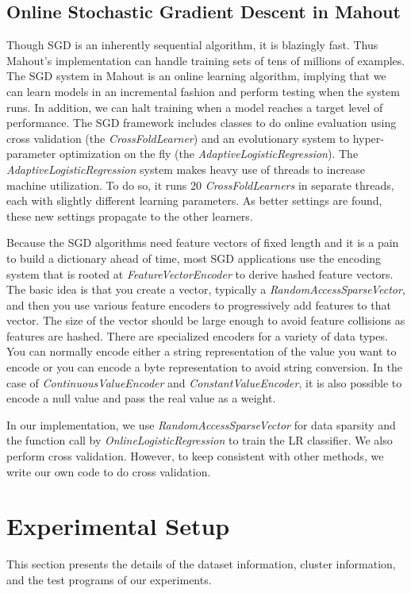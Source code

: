 \documentclass[10pt, conference, compsocconf]{IEEEtran}
\begin{document}
\subsection{Online Stochastic Gradient Descent in Mahout}
Though SGD is an inherently sequential algorithm, it is blazingly fast. Thus Mahout's implementation can handle training sets of tens of millions of examples.
The SGD system in Mahout is an online learning algorithm, implying that we can learn models in an incremental fashion and perform testing when the system runs.
In addition, we can halt training when a model reaches a target level of performance.
The SGD framework includes classes to do online evaluation using cross validation (the \textit{CrossFoldLearner}) and an evolutionary system to hyper-parameter optimization on the fly (the \textit{AdaptiveLogisticRegression}).
The \textit{AdaptiveLogisticRegression} system makes heavy use of threads to increase machine utilization.
To do so, it runs 20 \textit{CrossFoldLearners} in separate threads, each with slightly different learning parameters.
As better settings are found, these new settings propagate to the other learners.

Because the SGD algorithms need feature vectors of fixed length and it is a pain to build a dictionary ahead of time, most SGD applications use the encoding system that is rooted at \textit{FeatureVectorEncoder} to derive hashed feature vectors.
The basic idea is that you create a vector, typically a \textit{RandomAccessSparseVector}, and then you use various feature encoders to progressively add features to that vector.
The size of the vector should be large enough to avoid feature collisions as features are hashed.
There are specialized encoders for a variety of data types.
You can normally encode either a string representation of the value you want to encode or you can encode a byte representation to avoid string conversion.
In the case of \textit{ContinuousValueEncoder} and \textit{ConstantValueEncoder}, it is also possible to encode a null value and pass the real value as a weight.

In our implementation, we use \textit{RandomAccessSparseVector} for data sparsity and the function call by \textit{OnlineLogisticRegression} to train the LR classifier.
We also perform cross validation. However, to keep consistent with other methods, we write our own code to do cross validation.
	
\section{Experimental Setup} \label{sec:setup}
This section presents the details of the dataset information, cluster information, and the test programs of our experiments.
\end{document}
